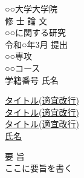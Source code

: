 \documentclass[paper=a4paper,hanging_punctuation,jafontscale=0.92469,titlepage,fontsize=12pt]{jlreq}
\begin{document}
\setlength{\baselineskip}{15pt}   %

\begin{center}
  {\Huge ○○大学大学院}\\[3cm]
  {\LARGE 修 士 論 文}\\[3cm]
  {\huge ○○に関する研究}\\[2cm]
  {\Large 令和○年3月 提出}\\[3cm]
  {\Large ○○専攻}\\
  {\Large ○○コース}\\[2cm]
  学籍番号 \hspace{2cm} 氏名
\end{center}

\newpage

\begin{center}
  \vspace*{4cm}
  {\Huge \underline{タイトル(適宜改行)}\\
    \underline{タイトル(適宜改行)}\\
    \underline{タイトル(適宜改行)}}\\[4cm]
  {\Large \underline{氏名}}
\end{center}

\newpage

\begin{center}
  {\Huge 要 旨}\\[1cm]
  \Large{ここに要旨を書く}

\end{center}

\vspace{2cm}

\newpage
\tableofcontents    %
\newpage
\listoffigures      %
\newpage
\listoftables       %
\newpage

























%
\end{document}

